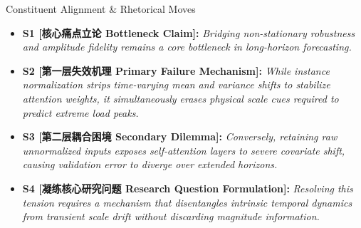 \begin{TipBox}{Constituent Alignment \& Rhetorical Moves}
\begin{itemize}[leftmargin=1.5em]
  \item \textbf{S1 [核心痛点立论 Bottleneck Claim]:} \textit{Bridging non-stationary robustness and amplitude fidelity remains a core bottleneck in long-horizon forecasting.}\par{}
  \item \textbf{S2 [第一层失效机理 Primary Failure Mechanism]:} \textit{While instance normalization strips time-varying mean and variance shifts to stabilize attention weights, it simultaneously erases physical scale cues required to predict extreme load peaks.}\par{}
  \item \textbf{S3 [第二层耦合困境 Secondary Dilemma]:} \textit{Conversely, retaining raw unnormalized inputs exposes self-attention layers to severe covariate shift, causing validation error to diverge over extended horizons.}\par{}
  \item \textbf{S4 [凝练核心研究问题 Research Question Formulation]:} \textit{Resolving this tension requires a mechanism that disentangles intrinsic temporal dynamics from transient scale drift without discarding magnitude information.}\par{}
\end{itemize}
\end{TipBox}
\bigskip
